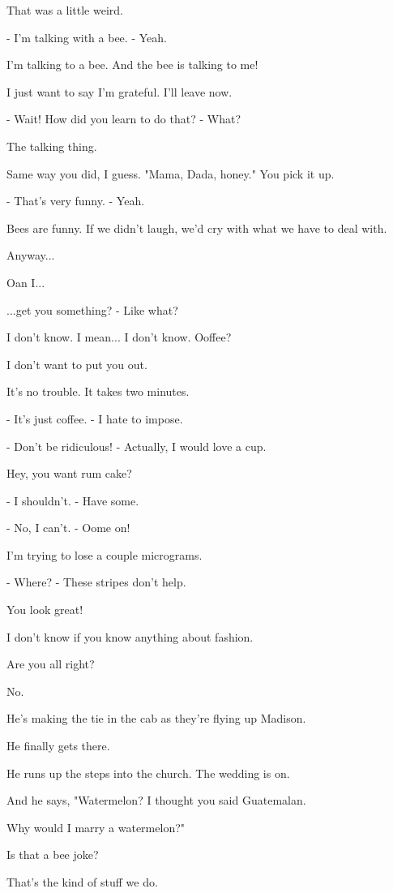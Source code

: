\documentclass[journal]{IEEEtran}
\begin{document}
  
That was a little weird.

  
- I'm talking with a bee.
- Yeah.

  
I'm talking to a bee.
And the bee is talking to me!

  
I just want to say I'm grateful.
I'll leave now.

  
- Wait! How did you learn to do that?
- What?

  
The talking thing.

  
Same way you did, I guess.
"Mama, Dada, honey." You pick it up.

  
- That's very funny.
- Yeah.

  
Bees are funny. If we didn't laugh,
we'd cry with what we have to deal with.

  
Anyway...

  
Oan I...

  
...get you something?
- Like what?

  
I don't know. I mean...
I don't know. Ooffee?

  
I don't want to put you out.

  
It's no trouble. It takes two minutes.

  
- It's just coffee.
- I hate to impose.

  
- Don't be ridiculous!
- Actually, I would love a cup.

  
Hey, you want rum cake?

  
- I shouldn't.
- Have some.

  
- No, I can't.
- Oome on!

  
I'm trying to lose a couple micrograms.

  
- Where?
- These stripes don't help.

  
You look great!

  
I don't know if you know
anything about fashion.

  
Are you all right?

  
No.

  
He's making the tie in the cab
as they're flying up Madison.

  
He finally gets there.

  
He runs up the steps into the church.
The wedding is on.

  
And he says, "Watermelon?
I thought you said Guatemalan.

  
Why would I marry a watermelon?"

  
Is that a bee joke?

  
That's the kind of stuff we do.
\end{document}
